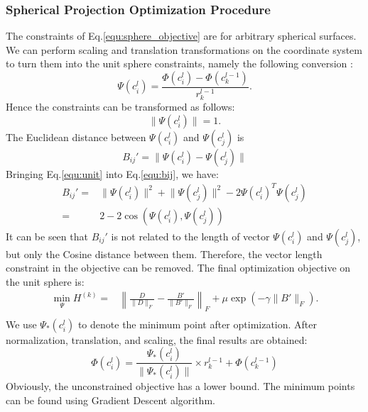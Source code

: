 \documentclass{article}
\theoremstyle{definition}
\begin{document}
    \subsubsection{Spherical Projection Optimization Procedure}
    The constraints of Eq.\ref{equ:sphere_objective} are for arbitrary spherical surfaces. We can perform scaling and translation transformations on the coordinate system to turn them into the unit sphere constraints, namely the following conversion :
    \begin{equation}
    	\label{equ:transfer}
    	\Psi(c_i^l) = \frac{\Phi(c_i^l) - \Phi(c_k^{l-1})}{r_k^{l-1}}.
    \end{equation}
    Hence the constraints can be transformed as follows:
    \begin{equation}
    \label{equ:unit}
    	\lVert \Psi(c_i^l) \rVert = 1.
    \end{equation}
    The Euclidean distance between $\Psi(c_i^{l})$ and $\Psi(c_j^l)$ is 
    \begin{equation}
    \label{equ:bij}
    	B_{ij}' = \lVert \Psi(c_i^{l}) - \Psi(c_j^l) \rVert
    \end{equation}
    Bringing Eq.\ref{equ:unit} into Eq.\ref{equ:bij}, we have:
    \begin{equation}
    \begin{split}
    	B_{ij}' = & \lVert \Psi(c_i^l) \rVert^2 + \lVert \Psi(c_j^l) \rVert^2 - 2 \Psi(c_i^l)^T \Psi(c_j^l) \\
    	= & 2 - 2\cos(\Psi(c_i^l), \Psi(c_j^l))
    \end{split}
    \end{equation}
    It can be seen that $B_{ij}'$ is not related to the length of vector $\Psi(c_i^l)$ and $\Psi(c_j^l)$, but only the Cosine distance between them. Therefore, the vector length constraint in the objective can be removed. The final optimization objective on the unit sphere is: 
    \begin{equation}
	 	\label{equ:unit_sphere_objective}
        \begin{split}
            \min_{\Psi} H^{(k)} =  & \left\lVert\frac{D}{\lVert D \rVert_F} - \frac{B'}{\lVert B' \rVert_F}\right\rVert_F + \mu \exp(- \gamma \lVert B' \rVert_F).\\ 
        \end{split}
    \end{equation}
    We use $\Psi_*(c_i^l)$ to denote the minimum point after optimization. After normalization, translation, and scaling, the final results are obtained: 
    \begin{equation}
    	\label{equ:sphere_transformation}
    	\Phi(c_i^l) = \frac{\Psi_*(c_i^l)}{\lVert \Psi_*(c_i^l) \rVert} \times r_k^{l-1} + \Phi(c_k^{l-1}) 
    \end{equation}
    Obviously, the unconstrained objective has a lower bound. The minimum points can be found using Gradient Descent algorithm.
\end{document}
